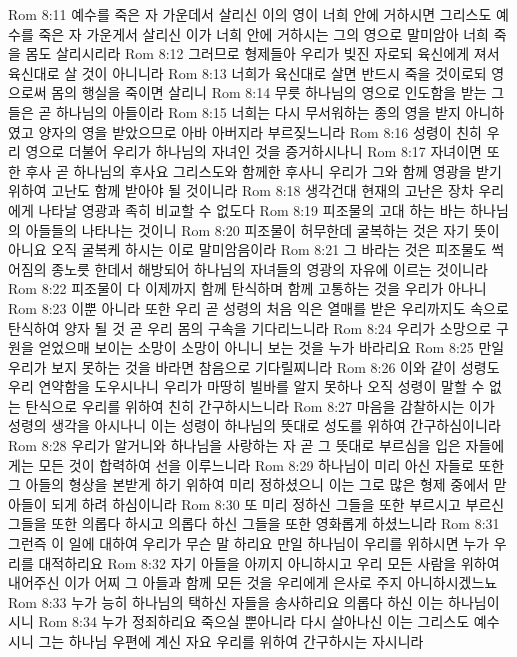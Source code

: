 Rom 8:11  예수를 죽은 자 가운데서 살리신 이의 영이 너희 안에 거하시면 그리스도 예수를 죽은 자 가운게서 살리신 이가 너희 안에 거하시는 그의 영으로 말미암아 너희 죽을 몸도 살리시리라
Rom 8:12  그러므로 형제들아 우리가 빚진 자로되 육신에게 져서 육신대로 살 것이 아니니라
Rom 8:13  너희가 육신대로 살면 반드시 죽을 것이로되 영으로써 몸의 행실을 죽이면 살리니
Rom 8:14  무릇 하나님의 영으로 인도함을 받는 그들은 곧 하나님의 아들이라
Rom 8:15  너희는 다시 무서워하는 종의 영을 받지 아니하였고 양자의 영을 받았으므로 아바 아버지라 부르짖느니라
Rom 8:16  성령이 친히 우리 영으로 더불어 우리가 하나님의 자녀인 것을 증거하시나니
Rom 8:17  자녀이면 또한 후사 곧 하나님의 후사요 그리스도와 함께한 후사니 우리가 그와 함께 영광을 받기 위하여 고난도 함께 받아야 될 것이니라
Rom 8:18  생각건대 현재의 고난은 장차 우리에게 나타날 영광과 족히 비교할 수 없도다
Rom 8:19  피조물의 고대 하는 바는 하나님의 아들들의 나타나는 것이니
Rom 8:20  피조물이 허무한데 굴복하는 것은 자기 뜻이 아니요 오직 굴복케 하시는 이로 말미암음이라
Rom 8:21  그 바라는 것은 피조물도 썩어짐의 종노릇 한데서 해방되어 하나님의 자녀들의 영광의 자유에 이르는 것이니라
Rom 8:22  피조물이 다 이제까지 함께 탄식하며 함께 고통하는 것을 우리가 아나니
Rom 8:23  이뿐 아니라 또한 우리 곧 성령의 처음 익은 열매를 받은 우리까지도 속으로 탄식하여 양자 될 것 곧 우리 몸의 구속을 기다리느니라
Rom 8:24  우리가 소망으로 구원을 얻었으매 보이는 소망이 소망이 아니니 보는 것을 누가 바라리요
Rom 8:25  만일 우리가 보지 못하는 것을 바라면 참음으로 기다릴찌니라
Rom 8:26  이와 같이 성령도 우리 연약함을 도우시나니 우리가 마땅히 빌바를 알지 못하나 오직 성령이 말할 수 없는 탄식으로 우리를 위하여 친히 간구하시느니라
Rom 8:27  마음을 감찰하시는 이가 성령의 생각을 아시나니 이는 성령이 하나님의 뜻대로 성도를 위하여 간구하심이니라
Rom 8:28  우리가 알거니와 하나님을 사랑하는 자 곧 그 뜻대로 부르심을 입은 자들에게는 모든 것이 합력하여 선을 이루느니라
Rom 8:29  하나님이 미리 아신 자들로 또한 그 아들의 형상을 본받게 하기 위하여 미리 정하셨으니 이는 그로 많은 형제 중에서 맏아들이 되게 하려 하심이니라
Rom 8:30  또 미리 정하신 그들을 또한 부르시고 부르신 그들을 또한 의롭다 하시고 의롭다 하신 그들을 또한 영화롭게 하셨느니라
Rom 8:31  그런즉 이 일에 대하여 우리가 무슨 말 하리요 만일 하나님이 우리를 위하시면 누가 우리를 대적하리요
Rom 8:32  자기 아들을 아끼지 아니하시고 우리 모든 사람을 위하여 내어주신 이가 어찌 그 아들과 함께 모든 것을 우리에게 은사로 주지 아니하시겠느뇨
Rom 8:33  누가 능히 하나님의 택하신 자들을 송사하리요 의롭다 하신 이는 하나님이시니
Rom 8:34  누가 정죄하리요 죽으실 뿐아니라 다시 살아나신 이는 그리스도 예수시니 그는 하나님 우편에 계신 자요 우리를 위하여 간구하시는 자시니라
